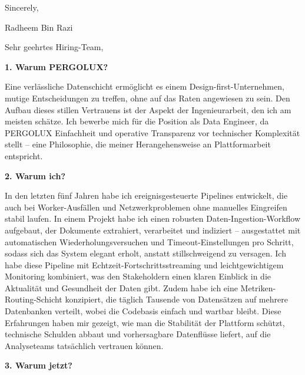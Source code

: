 \documentclass[11pt,a4paper]{coverletter}
\begin{document}
\closing{Sincerely,}{Radheem Bin Razi}

\clearpage
{}


\opening{Sehr geehrtes Hiring-Team,}

\vspace{8pt}\noindent\textbf{1. Warum PERGOLUX?}\par\vspace{3pt}

Eine verlässliche Datenschicht ermöglicht es einem Design-first-Unternehmen, mutige Entscheidungen zu treffen, ohne auf das Raten angewiesen zu sein. Den Aufbau dieses stillen Vertrauens ist der Aspekt der Ingenieurarbeit, den ich am meisten schätze. Ich bewerbe mich für die Position als Data Engineer, da PERGOLUX Einfachheit und operative Transparenz vor technischer Komplexität stellt – eine Philosophie, die meiner Herangehensweise an Plattformarbeit entspricht.

\vspace{8pt}\noindent\textbf{2. Warum ich?}\par\vspace{3pt}

In den letzten fünf Jahren habe ich ereignisgesteuerte Pipelines entwickelt, die auch bei Worker-Ausfällen und Netzwerkproblemen ohne manuelles Eingreifen stabil laufen. In einem Projekt habe ich einen robusten Daten-Ingestion-Workflow aufgebaut, der Dokumente extrahiert, verarbeitet und indiziert – ausgestattet mit automatischen Wiederholungsversuchen und Timeout-Einstellungen pro Schritt, sodass sich das System elegant erholt, anstatt stillschweigend zu versagen. Ich habe diese Pipeline mit Echtzeit-Fortschrittsstreaming und leichtgewichtigem Monitoring kombiniert, was den Stakeholdern einen klaren Einblick in die Aktualität und Gesundheit der Daten gibt. Zudem habe ich eine Metriken-Routing-Schicht konzipiert, die täglich Tausende von Datensätzen auf mehrere Datenbanken verteilt, wobei die Codebasis einfach und wartbar bleibt. Diese Erfahrungen haben mir gezeigt, wie man die Stabilität der Plattform schützt, technische Schulden abbaut und vorhersagbare Datenflüsse liefert, auf die Analyseteams tatsächlich vertrauen können.

\vspace{8pt}\noindent\textbf{3. Warum jetzt?}\par\vspace{3pt}
\end{document}
